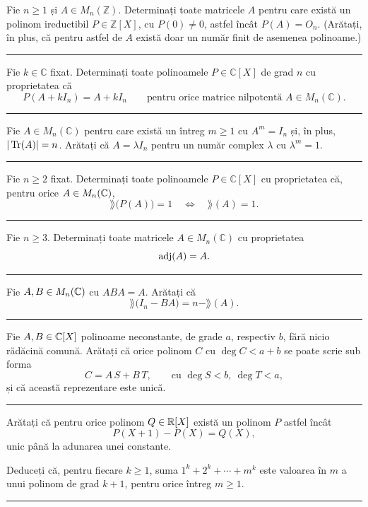 Fie $n\ge1$ și $A\in M_n(\mathbb{Z})$. Determinați toate matricele $A$ pentru care există un polinom ireductibil $P\in\mathbb{Z}[X]$, cu $P(0)\neq0$, astfel încât $P(A)=O_n$. (Arătați, în plus, că pentru astfel de $A$ există doar un număr finit de asemenea polinoame.)
\vspace{1mm}\hrule

Fie $k\in\mathbb{C}$ fixat. Determinați toate polinoamele $P\in\mathbb{C}[X]$ de grad $n$ cu proprietatea că
\[ P(A+kI_n)=A+kI_n\qquad\text{pentru orice matrice nilpotentă } A\in M_n(\mathbb{C}). \]
\vspace{1mm}\hrule

Fie $A\in M_n(\mathbb{C})$ pentru care există un întreg $m\ge1$ cu $A^m=I_n$ și, în plus, $|\operatorname{Tr}(A)|=n$. Arătați că $A=\lambda I_n$ pentru un număr complex $\lambda$ cu $\lambda^m=1$.
\vspace{1mm}\hrule

Fie $n\ge2$ fixat. Determinați toate polinoamele $P\in\mathbb{C}[X]$ cu proprietatea că, pentru orice $A\in M_n(\mathbb{C})$,
\[ \rang\bigl(P(A)\bigr)=1\quad\Longleftrightarrow\quad \rang(A)=1. \]
\vspace{1mm}\hrule

Fie $n \ge 3$. Determinați toate matricele $A \in M_n(\mathbb{C})$ cu proprietatea
\[
  \operatorname{adj}(A) = A.
\]
\vspace{1mm}\hrule

Fie $A,B \in M_n(\mathbb{C})$ cu $ABA = A$. Arătați că
\[
    \rang\bigl(I_n - BA\bigr) = n - \rang(A).
\]
\vspace{1mm}\hrule

Fie $A, B \in \mathbb{C}[X]$ polinoame neconstante, de grade $a$, respectiv $b$, fără nicio rădăcină comună. Arătați că orice polinom $C$ cu $\deg C < a + b$ se poate scrie sub forma
\[
C = A\,S + B\,T, \qquad \text{cu } \deg S < b,\ \deg T < a,
\]
și că această reprezentare este unică.
\vspace{1mm}\hrule

\begin{parti}
\item Arătați că pentru orice polinom $Q \in \mathbb{R}[X]$ există un polinom $P$ astfel încât
\[
P(X+1) - P(X) = Q(X),
\]
unic până la adunarea unei constante.

\item Deduceți că, pentru fiecare $k \geq 1$, suma $1^k + 2^k + \cdots + m^k$ este valoarea în $m$ a unui polinom de grad $k+1$, pentru orice întreg $m \geq 1$.
\end{parti}
\vspace{1mm}\hrule

